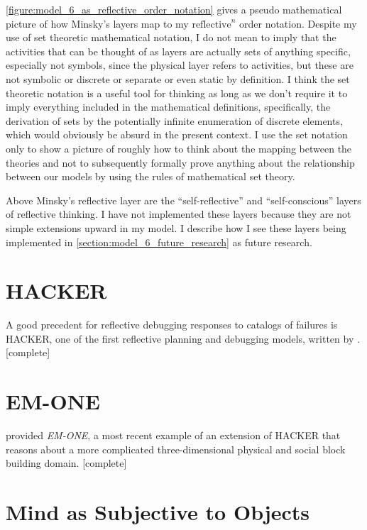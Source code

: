 \autoref{figure:model_6_as_reflective_order_notation} gives a pseudo
mathematical picture of how Minsky's layers map to my
$\text{reflective}^n$ order notation.  Despite my use of set theoretic
mathematical notation, I do not mean to imply that the activities that
can be thought of as layers are actually sets of anything specific,
especially not symbols, since the physical layer refers to activities,
but these are not symbolic or discrete or separate or even static by
definition.  I think the set theoretic notation is a useful tool for
thinking as long as we don't require it to imply everything included
in the mathematical definitions, specifically, the derivation of sets
by the potentially infinite enumeration of discrete elements, which
would obviously be absurd in the present context.  I use the set
notation only to show a picture of roughly how to think about the
mapping between the theories and not to subsequently formally prove
anything about the relationship between our models by using the rules
of mathematical set theory.

Above Minsky's reflective layer are the ``self-reflective'' and
``self-conscious'' layers of reflective thinking.  I have not
implemented these layers because they are not simple extensions upward
in my model.  I describe how I see these layers being implemented in
\autoref{section:model_6_future_research} as future research.

\section{HACKER}

A good precedent for reflective debugging responses to catalogs of
failures is HACKER, one of the first reflective planning and debugging
models, written by \cite{sussman:1973}.  [complete]

\section{EM-ONE}

\cite{singh:2005} provided \emph{EM-ONE}, a most recent example of an
extension of HACKER that reasons about a more complicated
three-dimensional physical and social block building domain.
[complete]

\section{Mind as Subjective to Objects}

